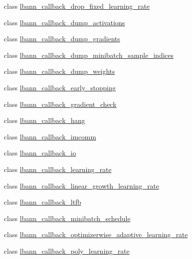 \begin{DoxyCompactItemize}
class \hyperlink{classlbann_1_1lbann__callback__drop__fixed__learning__rate}{lbann\+\_\+callback\+\_\+drop\+\_\+fixed\+\_\+learning\+\_\+rate}
\item 
class \hyperlink{classlbann_1_1lbann__callback__dump__activations}{lbann\+\_\+callback\+\_\+dump\+\_\+activations}
\item 
class \hyperlink{classlbann_1_1lbann__callback__dump__gradients}{lbann\+\_\+callback\+\_\+dump\+\_\+gradients}
\item 
class \hyperlink{classlbann_1_1lbann__callback__dump__minibatch__sample__indices}{lbann\+\_\+callback\+\_\+dump\+\_\+minibatch\+\_\+sample\+\_\+indices}
\item 
class \hyperlink{classlbann_1_1lbann__callback__dump__weights}{lbann\+\_\+callback\+\_\+dump\+\_\+weights}
\item 
class \hyperlink{classlbann_1_1lbann__callback__early__stopping}{lbann\+\_\+callback\+\_\+early\+\_\+stopping}
\item 
class \hyperlink{classlbann_1_1lbann__callback__gradient__check}{lbann\+\_\+callback\+\_\+gradient\+\_\+check}
\item 
class \hyperlink{classlbann_1_1lbann__callback__hang}{lbann\+\_\+callback\+\_\+hang}
\item 
class \hyperlink{classlbann_1_1lbann__callback__imcomm}{lbann\+\_\+callback\+\_\+imcomm}
\item 
class \hyperlink{classlbann_1_1lbann__callback__io}{lbann\+\_\+callback\+\_\+io}
\item 
class \hyperlink{classlbann_1_1lbann__callback__learning__rate}{lbann\+\_\+callback\+\_\+learning\+\_\+rate}
\item 
class \hyperlink{classlbann_1_1lbann__callback__linear__growth__learning__rate}{lbann\+\_\+callback\+\_\+linear\+\_\+growth\+\_\+learning\+\_\+rate}
\item 
class \hyperlink{classlbann_1_1lbann__callback__ltfb}{lbann\+\_\+callback\+\_\+ltfb}
\item 
class \hyperlink{classlbann_1_1lbann__callback__minibatch__schedule}{lbann\+\_\+callback\+\_\+minibatch\+\_\+schedule}
\item 
class \hyperlink{classlbann_1_1lbann__callback__optimizerwise__adaptive__learning__rate}{lbann\+\_\+callback\+\_\+optimizerwise\+\_\+adaptive\+\_\+learning\+\_\+rate}
\item 
class \hyperlink{classlbann_1_1lbann__callback__poly__learning__rate}{lbann\+\_\+callback\+\_\+poly\+\_\+learning\+\_\+rate}
\item 

\end{DoxyCompactItemize}
